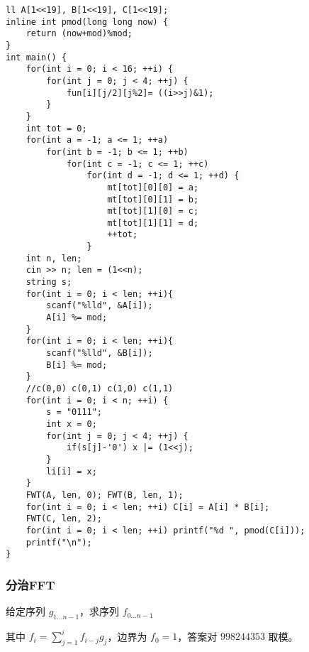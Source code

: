 \documentclass[UTF8]{ctexart}
\begin{document}
\begin{framed}
\begin{lstlisting}
ll A[1<<19], B[1<<19], C[1<<19];
inline int pmod(long long now) {
	return (now+mod)%mod;
}
int main() {
    for(int i = 0; i < 16; ++i) {
        for(int j = 0; j < 4; ++j) {
            fun[i][j/2][j%2]= ((i>>j)&1);
        }
    }
    int tot = 0;
    for(int a = -1; a <= 1; ++a) 
        for(int b = -1; b <= 1; ++b)
            for(int c = -1; c <= 1; ++c)
                for(int d = -1; d <= 1; ++d) {
                    mt[tot][0][0] = a;
                    mt[tot][0][1] = b;
                    mt[tot][1][0] = c;
                    mt[tot][1][1] = d;
                    ++tot;
                }
    int n, len;
    cin >> n; len = (1<<n);
    string s;
    for(int i = 0; i < len; ++i){
		scanf("%lld", &A[i]);
		A[i] %= mod;
	}
    for(int i = 0; i < len; ++i){
		scanf("%lld", &B[i]);
		B[i] %= mod;
	}
    //c(0,0) c(0,1) c(1,0) c(1,1)  
    for(int i = 0; i < n; ++i) {
    	s = "0111";
        int x = 0;
        for(int j = 0; j < 4; ++j) {
            if(s[j]-'0') x |= (1<<j);
        }
        li[i] = x;
    }
    FWT(A, len, 0); FWT(B, len, 1);
    for(int i = 0; i < len; ++i) C[i] = A[i] * B[i];
    FWT(C, len, 2);
    for(int i = 0; i < len; ++i) printf("%d ", pmod(C[i]));
    printf("\n");
}
\end{lstlisting}
\end{framed}

\subsubsection{分治FFT}
给定序列 $g_{1...n-1}$，求序列 $f_{0...n-1}$

其中 $f_i = \sum_{j=1}^i f_{i-j}g_j$，边界为 $f_0=1$，答案对 $998244353$ 取模。
\end{document}
